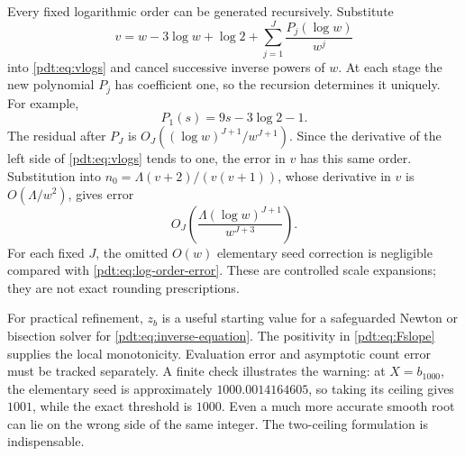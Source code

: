 Every fixed logarithmic order can be generated recursively. Substitute
\begin{equation}\label{pdt:eq:vrecursion}
 v=w-3\log w+\log2+\sum_{j=1}^J\frac{P_j(\log w)}{w^j}
\end{equation}
into \eqref{pdt:eq:vlogs} and cancel successive inverse powers of $w$. At each stage the new polynomial $P_j$ has coefficient one, so the recursion determines it uniquely. For example,
\[
 P_1(s)=9s-3\log2-1.
\]
The residual after $P_J$ is $O_J((\log w)^{J+1}/w^{J+1})$. Since the derivative of the left side of \eqref{pdt:eq:vlogs} tends to one, the error in $v$ has this same order. Substitution into $n_0=\Lambda(v+2)/(v(v+1))$, whose derivative in $v$ is $O(\Lambda/w^2)$, gives error
\begin{equation}\label{pdt:eq:log-order-error}
 O_J\!\left(\frac{\Lambda(\log w)^{J+1}}{w^{J+3}}\right).
\end{equation}
For each fixed $J$, the omitted $O(w)$ elementary seed correction is negligible compared with \eqref{pdt:eq:log-order-error}. These are controlled scale expansions; they are not exact rounding prescriptions.

For practical refinement, $z_b$ is a useful starting value for a safeguarded Newton or bisection solver for \eqref{pdt:eq:inverse-equation}. The positivity in \eqref{pdt:eq:Fslope} supplies the local monotonicity. Evaluation error and asymptotic count error must be tracked separately. A finite check illustrates the warning: at $X=b_{1000}$, the elementary seed is approximately $1000.0014164605$, so taking its ceiling gives $1001$, while the exact threshold is $1000$. Even a much more accurate smooth root can lie on the wrong side of the same integer. The two-ceiling formulation is indispensable.
